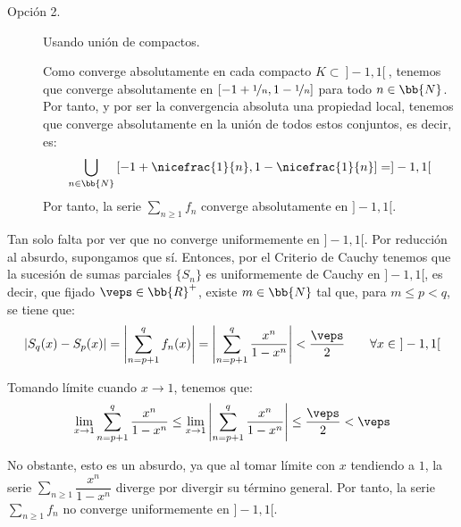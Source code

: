 \begin{ejercicio}
\begin{description}
        \item[Opción 2.] Usando unión de compactos.
        
        Como converge absolutamente en cada compacto $K\subset~]-1,1[~$, tenemos que converge absolutamente en $\left[-1+\nicefrac{1}{n}, 1-\nicefrac{1}{n}\right]$ para todo $n\in \bb{N}$.
        Por tanto, y por ser la convergencia absoluta una propiedad local, tenemos que converge absolutamente en la unión de todos estos conjuntos, es decir, es:
        \begin{equation*}
            \bigcup_{n\in \bb{N}}\left[-1+\nicefrac{1}{n}, 1-\nicefrac{1}{n}\right] = ]-1,1[
        \end{equation*}
        Por tanto, la serie $\sum\limits_{n\geq 1}f_n$ converge absolutamente en $]-1,1[$.
    \end{description}

    Tan solo falta por ver que no converge uniformemente en $]-1,1[$. Por reducción al absurdo, supongamos que sí.
    Entonces, por el Criterio de Cauchy tenemos que la sucesión de sumas parciales $\{S_n\}$ es uniformemente de Cauchy en $]-1,1[$, es decir, que fijado
    $\veps\in \bb{R}^+$, existe $m\in \bb{N}$ tal que, para $m\leq p < q$, se tiene que:
    \begin{equation*}
        |S_q(x) - S_p(x)| = \left|\sum_{n=p+1}^q f_n(x)\right|
        = \left|\sum_{n=p+1}^q \frac{x^n}{1-x^n}\right| < \frac{\veps}{2} \qquad \forall x\in~]-1,1[
    \end{equation*}
    
    Tomando límite cuando $x\to 1$, tenemos que:
    \begin{equation*}
        \lim_{x\to 1}\sum_{n=p+1}^q \frac{x^n}{1-x^n} \leq \lim_{x\to 1}\left|\sum_{n=p+1}^q \frac{x^n}{1-x^n}\right| \leq \frac{\veps}{2} < \veps
    \end{equation*}

    No obstante, esto es un absurdo, ya que al tomar límite con $x$ tendiendo a $1$, la serie $\sum\limits_{n\geq 1}\dfrac{x^n}{1-x^n}$ diverge por divergir
    su término general. Por tanto, la serie $\sum\limits_{n\geq 1}f_n$ no converge uniformemente en $]-1,1[$.
\end{ejercicio}


